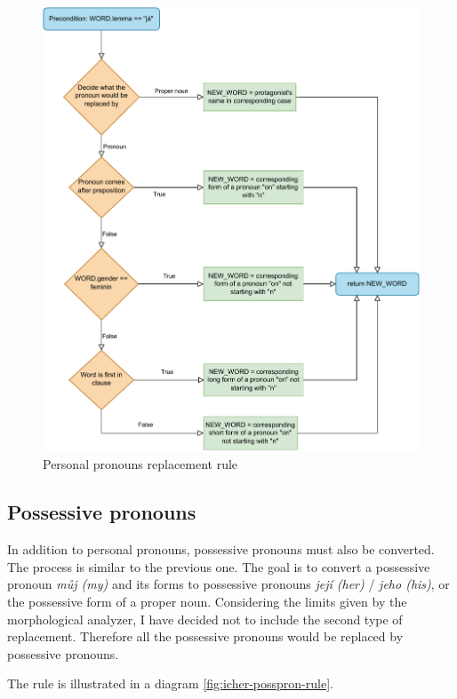 \begin{figure}[ht!]
\includegraphics[width=\textwidth]{data/Icher-Perspron-Rule.pdf}
\caption{Personal pronouns replacement rule}
\label{fig:icher-perspron-rule}
\end{figure}

\subsection{Possessive pronouns}

In addition to personal pronouns, possessive pronouns must also be converted. The process is similar to the previous one. The goal is to convert a possessive pronoun \emph{můj (my)} and its forms to possessive pronouns \emph{její (her)} / \emph{jeho (his)}, or the possessive form of a proper noun. Considering the limits given by the morphological analyzer, I have decided not to include the second type of replacement. Therefore all the possessive pronouns would be replaced by possessive pronouns.

The rule is illustrated in a diagram \ref{fig:icher-posspron-rule}.

